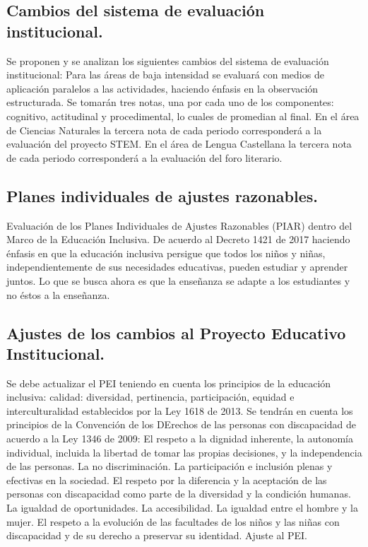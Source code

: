\documentclass[12pt, letterpaper, twoside]{article}
\begin{document}
    \subsection{Cambios del sistema de evaluación institucional.}Se proponen y se analizan los siguientes cambios del sistema de evaluación institucional:
Para las áreas de baja intensidad se evaluará con medios de aplicación paralelos a las actividades, haciendo énfasis en la observación estructurada. Se tomarán tres notas, una por cada uno de los componentes: cognitivo, actitudinal y procedimental, lo cuales de promedian al final.
En el área de Ciencias Naturales la tercera nota de cada periodo corresponderá a la evaluación del proyecto STEM.
En el área de Lengua Castellana la tercera nota de cada periodo corresponderá a la evaluación del foro literario.
    \subsection{Planes individuales de ajustes razonables.}Evaluación de los Planes Individuales de Ajustes Razonables (PIAR) dentro del Marco de la Educación Inclusiva. De acuerdo al Decreto 1421 de 2017 haciendo énfasis en que la educación inclusiva persigue que todos los niños y niñas, independientemente de sus necesidades educativas, pueden estudiar y aprender juntos. Lo que se busca ahora es que la enseñanza se adapte a los estudiantes y no éstos a la enseñanza.
    \subsection{Ajustes de los cambios al Proyecto Educativo Institucional.}Se debe actualizar el PEI teniendo en cuenta los principios de la educación inclusiva: calidad: diversidad, pertinencia, participación, equidad e interculturalidad establecidos por la Ley 1618 de 2013. Se tendrán en cuenta los principios de la Convención de los DErechos de las personas con discapacidad de acuerdo a la Ley 1346 de 2009:
El respeto a la dignidad inherente, la autonomía individual, incluida la libertad de tomar las propias decisiones, y la independencia de las personas.
La no discriminación.
La participación e inclusión plenas y efectivas en la sociedad.
El respeto por la diferencia y la aceptación de las personas con discapacidad como parte de la diversidad y la condición humanas.
La igualdad de oportunidades.
La accesibilidad.
La igualdad entre el hombre y la mujer.
El respeto a la evolución de las facultades de los niños y las niñas con discapacidad y de su derecho a preservar su identidad.
Ajuste al PEI. 
\end{document}
